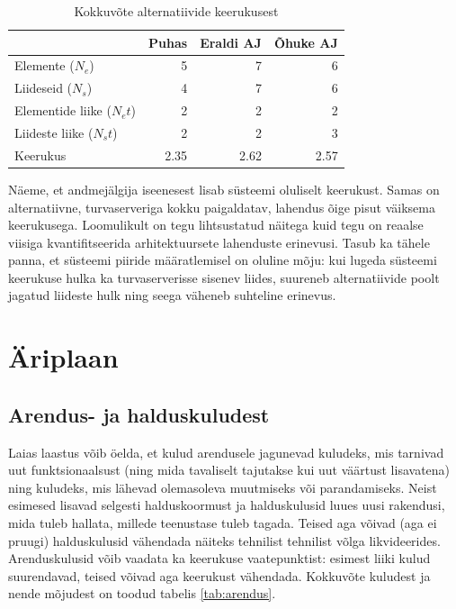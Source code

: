 \documentclass{tufte-book}
\begin{document}
\begin{table}
	\begin{center}
		\begin{tabular}{p{3.6 cm}rrr}
		\toprule
& Puhas & Eraldi AJ & Õhuke AJ \\
		\midrule
Elemente ($N_e$) &	5 &	7 &	6\\
Liideseid  ($N_s$)	& 4 &	7 &	6\\
Elementide liike  ($N_et$)&	2	&2	&2\\
Liideste liike  ($N_st$)&	2 &	2 &	3\\
		\midrule
Keerukus &	2.35 &	2.62	 &2.57\\
		\bottomrule
		\end{tabular}
		\caption{Kokkuvõte alternatiivide keerukusest}
		\label{tab:complexity}

	\end{center}
\end{table}

Näeme, et andmejälgija iseenesest lisab süsteemi oluliselt keerukust. Samas on alternatiivne, turvaserveriga kokku paigaldatav, lahendus õige pisut väiksema keerukusega. Loomulikult on tegu lihtsustatud näitega kuid tegu on reaalse viisiga kvantifitseerida arhitektuursete lahenduste erinevusi. Tasub ka tähele panna, et süsteemi piiride määratlemisel on oluline mõju: kui lugeda süsteemi keerukuse hulka ka turvaserverisse sisenev liides, suureneb alternatiivide poolt jagatud liideste hulk ning seega väheneb suhteline erinevus. 
	
\chapter{Äriplaan}
\section{Arendus- ja halduskuludest}
\label{sec:kulud}
Laias laastus võib öelda, et kulud arendusele jagunevad kuludeks, mis tarnivad uut funktsionaalsust (ning mida tavaliselt tajutakse kui uut väärtust lisavatena) ning kuludeks, mis lähevad olemasoleva muutmiseks või parandamiseks. Neist esimesed lisavad selgesti halduskoormust ja halduskulusid luues uusi rakendusi, mida tuleb hallata, millede teenustase tuleb tagada. Teised aga võivad (aga ei pruugi) halduskulusid vähendada näiteks tehnilist tehnilist võlga likvideerides. Arenduskulusid võib vaadata ka keerukuse vaatepunktist: esimest liiki kulud suurendavad, teised võivad aga keerukust vähendada. Kokkuvõte kuludest ja nende mõjudest on toodud tabelis \ref{tab:arendus}.
\end{document}
